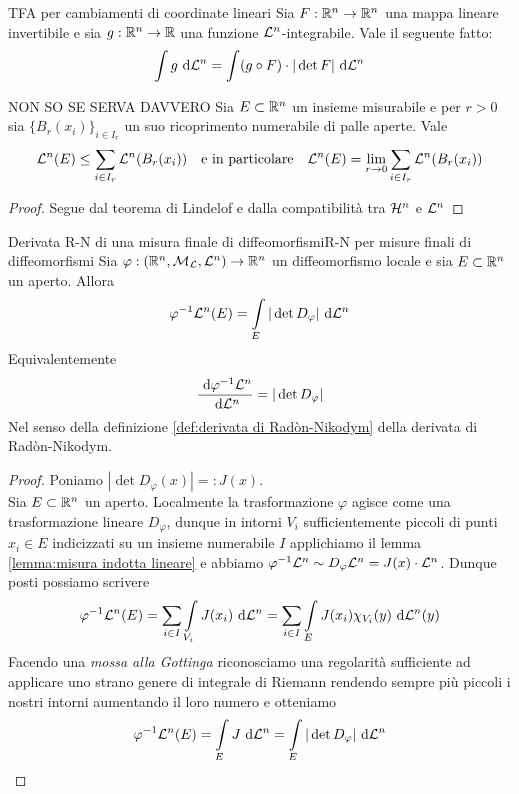 \documentclass{article}
\begin{document}
\begin{theorem}{TFA per cambiamenti di coordinate lineari}{}
    Sia $F : \mathbb{R}^n \to \mathbb{R}^n$ una mappa lineare invertibile e sia $g: \mathbb{R}^n \to \mathbb{R}$ una funzione $\mathcal{L}^n$-integrabile. Vale il seguente fatto:
    \[\int\limits g \text{ d} \mathcal{L}^n = \int\limits (g \circ F) \cdot |\det F| \text{ d} \mathcal{L}^n \] 
\end{theorem}

\begin{lemma}{NON SO SE SERVA DAVVERO}{}
    Sia $E\subset \mathbb{R}^n$ un insieme misurabile e per $r>0$ sia $\{B_r(x_i)\}_{i \in I_r}$ un suo ricoprimento numerabile di palle aperte. Vale
    \[\mathcal{L}^n(E) \le \sum_{i \in I_r} \mathcal{L}^n(B_r(x_i)) \quad \text{e in particolare}\quad \mathcal{L}^n(E) = \lim_{r \to 0} \sum_{i \in I_r} \mathcal{L}^n(B_r(x_i))\]
    \begin{proof}
        Segue dal teorema di Lindelof e dalla compatibilità tra $\mathcal{H}^n$ e $\mathcal{L}^n$
    \end{proof}
\end{lemma}

\begin{theorem}{Derivata R-N di una misura finale di diffeomorfismi}{R-N per misure finali di diffeomorfismi}
    Sia $\varphi : (\mathbb{R}^n, \mathcal{M}_{\mathcal{L}}, \mathcal{L}^n) \to \mathbb{R}^n$ un diffeomorfismo locale e sia $E \subset \mathbb{R}^n$ un aperto. Allora 
    \[\varphi^{-1}\mathcal{L}^n(E) = \int\limits_E|\det D_\varphi|\text{ d} \mathcal{L}^n\]
    Equivalentemente
    \[\frac{\text{ d} \varphi^{-1} \mathcal{L}^n}{\text{ d} \mathcal{L}^n} = |\det D_\varphi|\]
    Nel senso della definizione \ref{def:derivata di Radòn-Nikodym} della derivata di Radòn-Nikodym.
    \begin{proof}
        Poniamo $|\det D_\varphi(x)| =: J(x)$.\\
        Sia $E\subset \mathbb{R}^n$ un aperto. Localmente la trasformazione $\varphi$ agisce come una trasformazione lineare $D_\varphi$, dunque in intorni $V_i$ sufficientemente piccoli di punti $x_i\in E$ indicizzati su un insieme numerabile $I$ applichiamo il lemma \ref{lemma:misura indotta lineare} e abbiamo $\varphi^{-1} \mathcal{L}^n \sim D_\varphi \mathcal{L}^n = J(x)\cdot \mathcal{L}^n$. Dunque posti possiamo scrivere
        \[\varphi^{-1}\mathcal{L}^n(E) = \sum_{i \in I} \int\limits_{V_i} J(x_i)\text{ d} \mathcal{L}^n = \sum_{i \in I} \int\limits_E J(x_i) \chi_{V_i}(y)\text{ d} \mathcal{L}^n(y)\]
        Facendo una \textit{mossa alla Gottinga} riconosciamo una regolarità sufficiente ad applicare uno strano genere di integrale di Riemann rendendo sempre più piccoli i nostri intorni aumentando il loro numero e otteniamo
        \[\varphi^{-1}\mathcal{L}^n(E) = \int\limits_E J \text{ d} \mathcal{L}^n = \int\limits_E |\det D_\varphi|\text{ d} \mathcal{L}^n\]
    \end{proof} 
\end{theorem}
\end{document}
